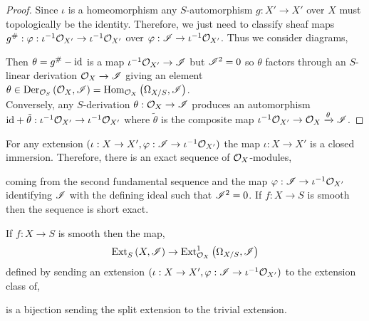 \documentclass[12pt]{article}
\begin{document}
\begin{proof}
Since $\iota$ is a homeomorphism any $S$-automorphism $g : X' \to X'$ over $X$ must topologically be the identity. Therefore, we just need to classify sheaf maps $g^\# : \varphi : \iota^{-1} \struct{X'} \to \iota^{-1} \struct{X'}$ over $\varphi : \I \to \iota^{-1} \struct{X'}$. Thus we consider diagrams,
\begin{center}
\end{center}
Then $\theta = g^\# - \id$ is a map $\iota^{-1} \struct{X'} \to \I$ but $\I^2 = 0$ so $\theta$ factors through an $S$-linear derivation $\struct{X} \to \I$ giving an element $\theta \in \Der[\struct{S}]{\struct{X}}{\I} = \Hom{\struct{X}}{\Omega_{X/S}}{\I}$. 
\bigskip\\
Conversely, any $S$-derivation $\theta : \struct{X} \to \I$ produces an automorphism $\id + \tilde{\theta} : \iota^{-1} \struct{X'} \to \iota^{-1} \struct{X'}$ where $\tilde{\theta}$ is the composite map $\iota^{-1} \struct{X'} \to \struct{X} \tolabel{\theta} \I$.
\end{proof}

\begin{rmk}
For any extension $(\iota : X \to X', \varphi : \I \to \iota^{-1} \struct{X'})$ the map $\iota : X \to X'$ is a closed immersion. Therefore, there is an exact sequence of $\struct{X}$-modules,
\begin{center}
\end{center}
coming from the second fundamental sequence and the map $\varphi : \I \to \iota^{-1} \struct{X'}$ identifying $\I$ with the defining ideal such that $\I^2 = 0$. If $f : X \to S$ is smooth then the sequence is short exact.
\end{rmk}

\begin{prop}
If $f : X \to S$ is smooth then the map,
\[ \Ext{}{S}{X}{\I} \to \Ext{1}{\struct{X}}{\Omega_{X/S}}{\I} \]
defined by sending an extension $(\iota : X \to X', \varphi : \I \to \iota^{-1} \struct{X'})$ to the extension class of,
\begin{center}
\end{center}
is a bijection sending the split extension to the trivial extension.
\end{prop}
\end{document}
